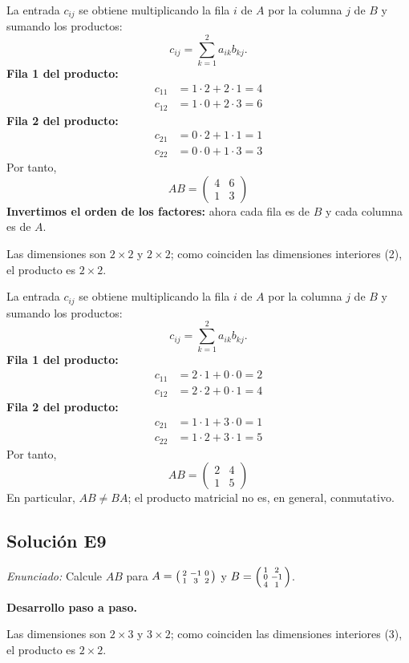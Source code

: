 \documentclass[12pt]{article}
\theoremstyle{remark}
\newcommand{\solucion}[2]{\Needspace{11\baselineskip}\subsection*{Solución E#1}\noindent\textit{Enunciado:} #2\par\medskip\noindent\textbf{Desarrollo paso a paso.}\par\medskip}
\begin{document}
La entrada $c_{ij}$ se obtiene multiplicando la fila $i$ de $A$ por la columna $j$ de $B$ y sumando los productos:
\[
c_{ij}=\sum_{k=1}^{2} a_{ik}b_{kj}.
\]
\textbf{Fila 1 del producto:}
\[
\begin{aligned}c_{11}&=1\cdot 2+2\cdot 1=4\\c_{12}&=1\cdot 0+2\cdot 3=6\end{aligned}
\]
\textbf{Fila 2 del producto:}
\[
\begin{aligned}c_{21}&=0\cdot 2+1\cdot 1=1\\c_{22}&=0\cdot 0+1\cdot 3=3\end{aligned}
\]
Por tanto,
\[
\boxed{AB=\begin{pmatrix}4&6\\1&3\end{pmatrix}}
\]
\textbf{Invertimos el orden de los factores:} ahora cada fila es de $B$ y cada columna es de $A$.

Las dimensiones son $2\times2$ y $2\times2$; como coinciden las dimensiones interiores (2), el producto es $2\times2$.

La entrada $c_{ij}$ se obtiene multiplicando la fila $i$ de $A$ por la columna $j$ de $B$ y sumando los productos:
\[
c_{ij}=\sum_{k=1}^{2} a_{ik}b_{kj}.
\]
\textbf{Fila 1 del producto:}
\[
\begin{aligned}c_{11}&=2\cdot 1+0\cdot 0=2\\c_{12}&=2\cdot 2+0\cdot 1=4\end{aligned}
\]
\textbf{Fila 2 del producto:}
\[
\begin{aligned}c_{21}&=1\cdot 1+3\cdot 0=1\\c_{22}&=1\cdot 2+3\cdot 1=5\end{aligned}
\]
Por tanto,
\[
\boxed{AB=\begin{pmatrix}2&4\\1&5\end{pmatrix}}
\]
En particular, $AB\ne BA$; el producto matricial no es, en general, conmutativo.


\medskip

\solucion{9}{Calcule $AB$ para $A=\begin{psmallmatrix}2&-1&0\\1&3&2\end{psmallmatrix}$ y $B=\begin{psmallmatrix}1&2\\0&-1\\4&1\end{psmallmatrix}$.}
Las dimensiones son $2\times3$ y $3\times2$; como coinciden las dimensiones interiores (3), el producto es $2\times2$.
\end{document}
